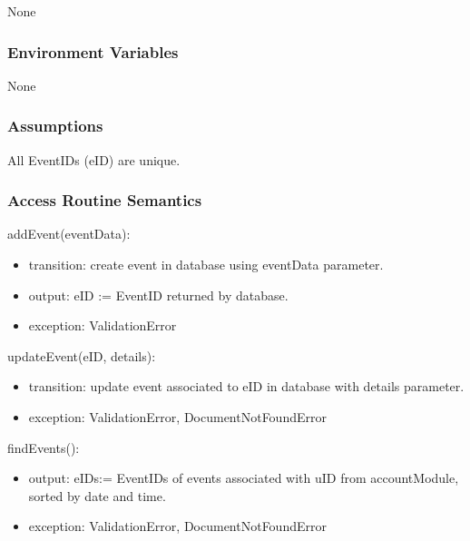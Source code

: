\documentclass[12pt, titlepage]{article}
\begin{document}
None


\subsubsection{Environment Variables}

None


\subsubsection{Assumptions}

All EventIDs (eID) are unique.


\subsubsection{Access Routine Semantics}

\noindent addEvent(eventData):
\begin{itemize}
\item transition: create event in database using eventData parameter.
\item output: eID := EventID returned by database.
\item exception: ValidationError
\end{itemize}

\noindent updateEvent(eID, details):
\begin{itemize}
\item transition: update event associated to eID in database with details parameter.
\item exception: ValidationError, DocumentNotFoundError
\end{itemize}

\noindent findEvents():
\begin{itemize}
\item output: eIDs:= EventIDs of events associated with uID from accountModule, sorted by date and time.
\item exception: ValidationError, DocumentNotFoundError
\end{itemize}
\end{document}
